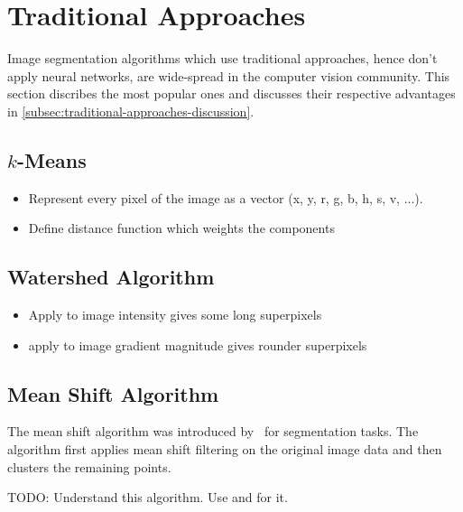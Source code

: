 \section{Traditional Approaches}\label{sec:traditional-approaches}

Image segmentation algorithms which use traditional approaches, hence don't
apply neural networks, are wide-spread in the computer vision community.
This section discribes the most popular ones and discusses their respective
advantages in \cref{subsec:traditional-approaches-discussion}.

\subsection{$k$-Means}\label{subsec:k-means}

\begin{itemize}
    \item Represent every pixel of the image as a vector (x, y, r, g, b, h, s,
          v, ...).
    \item Define distance function which weights the components
\end{itemize}


\subsection{Watershed Algorithm}\label{subsec:watershed}

\begin{itemize}
    \item Apply to image intensity gives some long superpixels
    \item apply to image gradient magnitude gives rounder superpixels
\end{itemize}



\subsection{Mean Shift Algorithm}\label{subsec:mean-shift}
The mean shift algorithm was introduced by~\cite{comaniciu2002mean} for
segmentation tasks. The algorithm first applies mean shift filtering on the
original image data and then clusters the remaining points.

TODO: Understand this algorithm. Use \cite{comaniciu2002mean} and
\cite{pantofaru2005comparison} for it.


